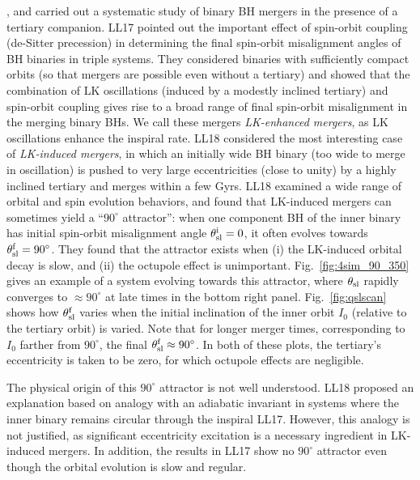 \documentclass[
        twocolumn,
        twocolappendix
    ]{aastex63}
\begin{document}
\citet[][hereafter LL17, LL18]{bin1, bin2}, and \citet{bin3} carried out a
systematic study of binary BH mergers in the presence of a tertiary companion.
LL17 pointed out the important effect of spin-orbit coupling (de-Sitter
precession) in determining the final spin-orbit misalignment angles of BH
binaries in triple systems. They considered binaries with sufficiently compact
orbits (so that mergers are possible even without a tertiary) and showed that
the combination of LK oscillations (induced by a modestly inclined tertiary) and
spin-orbit coupling gives rise to a broad range of final spin-orbit misalignment
in the merging binary BHs. We call these mergers \emph{LK-enhanced mergers}, as
LK oscillations enhance the inspiral rate. LL18 considered the most interesting
case of \emph{ LK-induced mergers}, in which an initially wide BH binary (too
wide to merge in oscillation) is pushed to very large eccentricities (close to
unity) by a highly inclined tertiary and merges within a few Gyrs. LL18 examined
a wide range of orbital and spin evolution behaviors, and found that LK-induced
mergers can sometimes yield a ``$90^\circ$ attractor'': when one component BH of
the inner binary has initial spin-orbit misalignment angle $\theta_{\rm sl}^{\rm
i} = 0$, it often evolves towards $\theta_{\rm sl}^{\rm f} = 90^\circ$. They
found that the attractor exists when (i) the LK-induced orbital decay is slow,
and (ii) the octupole effect is unimportant. Fig.~\ref{fig:4sim_90_350} gives an
example of a system evolving towards this attractor, where $\theta_{\rm sl}$
rapidly converges to $\approx 90^\circ$ at late times in the bottom right panel.
Fig.~\ref{fig:qslscan} shows how $\theta_{\rm sl}^{\rm f}$ varies when the
initial inclination of the inner orbit $I_0$ (relative to the tertiary orbit) is
varied. Note that for longer merger times, corresponding to $I_0$ farther from
$90^\circ$, the final $\theta_{\rm sl}^{\rm f} \approx 90^\circ$. In both of
these plots, the tertiary's eccentricity is taken to be zero, for which octupole
effects are negligible.

The physical origin of this $90^\circ$ attractor is not well understood.
LL18 proposed an explanation based on analogy with an adiabatic
invariant in systems where the inner binary remains circular through the
inspiral LL17. However, this analogy is not justified, as significant
eccentricity excitation is a necessary ingredient in LK-induced mergers. In
addition, the results in LL17 show no $90^\circ$ attractor even though
the orbital evolution is slow and regular.
\end{document}
